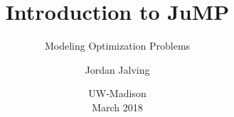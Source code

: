 \documentclass[xcolor={dvipsnames}]{beamer}
\title[Introduction to JuMP] %
{Introduction to JuMP}
\subtitle{Modeling Optimization Problems}
\author[Jalving] %
{Jordan Jalving}
\institute[UW-Madison] %
{
  Department of Chemical and Biological Engineering\\
  University of Wisconsin-Madison\\\vspace{0.1in}
}
\date[March 2018] %
{UW-Madison\\ March 2018}
\begin{document}
\frame{\titlepage}


\end{document}
